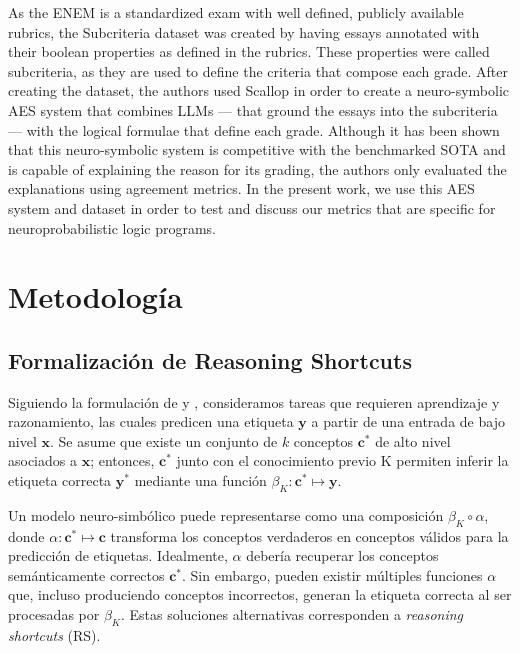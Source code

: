 \documentclass[12pt]{article}
\begin{document}
As the ENEM is a standardized exam with well defined, publicly available rubrics, the Subcriteria dataset \cite{feedbackpropor} was created by having essays annotated with their boolean properties as defined in the rubrics. These properties were called subcriteria, as they are used to define the criteria that compose each grade. After creating the dataset, the authors used Scallop in order to create a neuro-symbolic AES system that combines LLMs --- that ground the essays into the subcriteria --- with the logical formulae that define each grade. 
Although it has been shown that this neuro-symbolic system is competitive with the benchmarked SOTA \cite{JBCS} and is capable of explaining the reason for its grading, the authors only evaluated the explanations using agreement metrics. In the present work, we use this AES system and dataset in order to test and discuss our metrics that are specific for neuroprobabilistic logic programs.  


\section{Metodología} \label{sec:methods}

\subsection{Formalización de Reasoning Shortcuts}

Siguiendo la formulación de \cite{Bortolotti2024} y \cite{Marconato2023-NotAll}, consideramos tareas que requieren aprendizaje y razonamiento, las cuales predicen una etiqueta $\mathbf{y}$ a partir de una entrada de bajo nivel $\mathbf{x}$. Se asume que existe un conjunto de $k$ conceptos $\mathbf{c}^*$ de alto nivel asociados a $\mathbf{x}$; entonces, $\mathbf{c}^*$ junto con el conocimiento previo $\mathrm{K}$ permiten inferir la etiqueta correcta $\mathbf{y}^*$ mediante una función $\beta_K: \mathbf{c^*} \mapsto \mathbf{y}$.

Un modelo neuro-simbólico puede representarse como una composición $\beta_K \circ \alpha$, donde $\alpha: \mathbf{c}^* \mapsto \mathbf{c}$ transforma los conceptos verdaderos en conceptos válidos para la predicción de etiquetas. Idealmente, $\alpha$ debería recuperar los conceptos semánticamente correctos $\mathbf{c}^*$. Sin embargo, pueden existir múltiples funciones $\alpha$ que, incluso produciendo conceptos incorrectos, generan la etiqueta correcta al ser procesadas por $\beta_K$. Estas soluciones alternativas corresponden a \textit{reasoning shortcuts} (RS).
\end{document}
